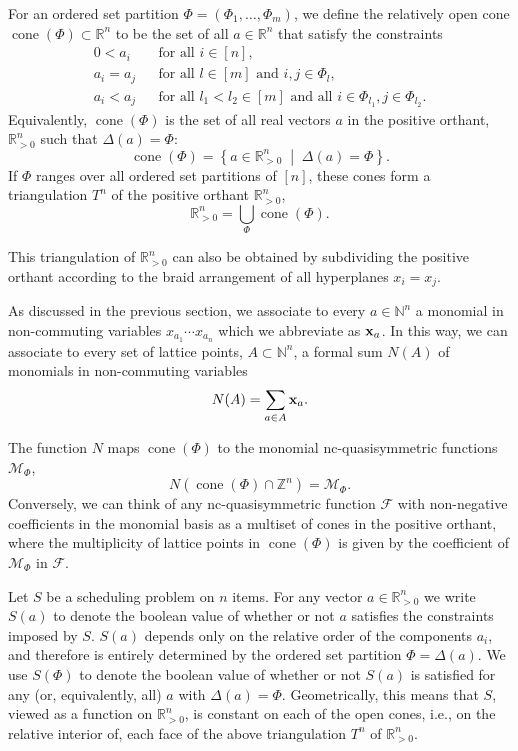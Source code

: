 \documentclass[12pt,reqno]{amsart}
\numberwithin{definition}{section}
\theoremstyle{definition}
\newcommand{\RR}{\mathbb{R}}
\newcommand{\NN}{\mathbb{N}}
\newcommand{\ZZ}{\mathbb{Z}}
\newcommand{\SSS}{\mathcal{S}}
\newcommand{\cone}{\operatorname{cone}}
\newcommand{\mset}[2]{ \left\{ #1 \; \middle| \; #2 \right\}}
\newcommand{\ncM}{\mathcal{M}}
\newcommand{\poly}{\chi} %
\newcommand{\comment}[1]{\textsf{\footnotesize #1}}
\begin{document}
For an ordered set partition $\Phi=(\Phi_1,\ldots,\Phi_m)$, we define the relatively open cone $\cone(\Phi)\subset\RR^n$ to be the set of all $a\in\RR^n$ that satisfy the constraints
\begin{eqnarray*}
0 < a_i && \text{for all $i\in[n]$}, \\
a_i = a_j && \text{for all $l\in[m]$ and $i,j\in\Phi_l$}, \\
a_i < a_j && \text{for all $l_1 < l_2\in[m]$ and all $i\in\Phi_{l_1}, j\in\Phi_{l_2}$}.
\end{eqnarray*}
Equivalently, $\cone(\Phi)$ is the set of all real vectors $a$ in the positive orthant, $\RR_{> 0}^n$ such that $\Delta(a)=\Phi$: 
\[
\cone(\Phi) = \mset{a\in\RR_{> 0}^n}{\Delta(a)=\Phi}.
\]
 If $\Phi$ ranges over all ordered set partitions of $[n]$, these cones form a triangulation $T^n$ of the positive orthant $\RR_{> 0}^n$, 
\[
  \RR_{> 0}^n = \bigcup_\Phi \cone(\Phi).
\]


This triangulation of $\RR_{> 0}^n$ can also be obtained by subdividing the positive orthant according to the braid arrangement of all hyperplanes $x_i=x_j$.

As discussed in the previous section, we associate to every $a\in\NN^n$ a monomial in non-commuting variables $x_{a_1}\cdots x_{a_n}$ which we abbreviate as ${\bf x}_a$. In this way, we can associate to every set of lattice points, $A\subset\NN^n$, a formal sum $N(A)$ of monomials in non-commuting variables
\[
  N(A) = \sum_{a\in A} {\bf x}_a.
\]

The function $N$ maps $\cone(\Phi)$ to the monomial nc-quasisymmetric functions $\ncM_\Phi$,
\[
  N(\cone(\Phi)\cap\ZZ^n) = \ncM_\Phi.
\]
Conversely, we can think of any nc-quasisymmetric function $\mathcal{F}$ with non-negative coefficients in the monomial basis as a multiset of cones in the positive orthant, where the multiplicity of lattice points in $\cone(\Phi)$ is given by the coefficient of $\ncM_\Phi$ in $\mathcal{F}$.






Let $S$ be a scheduling problem on $n$ items. For any vector $a\in\RR^n_{> 0}$ we write $S(a)$ to denote the boolean value of whether or not $a$ satisfies the constraints imposed by $S$.  $S(a)$ depends only on the relative order of the components $a_i$, and therefore is entirely determined by the ordered set partition $\Phi=\Delta(a)$. We use $S(\Phi)$ to denote the boolean value of whether or not $S(a)$ is satisfied for any (or, equivalently, all) $a$ with $\Delta(a)=\Phi$. Geometrically, this means that $S$, viewed as a function on $\RR^n_{>0}$, is constant on each of the open cones, i.e., on the relative interior of, each face of the above triangulation $T^n$ of $\RR^n_{> 0}$.
\end{document}
